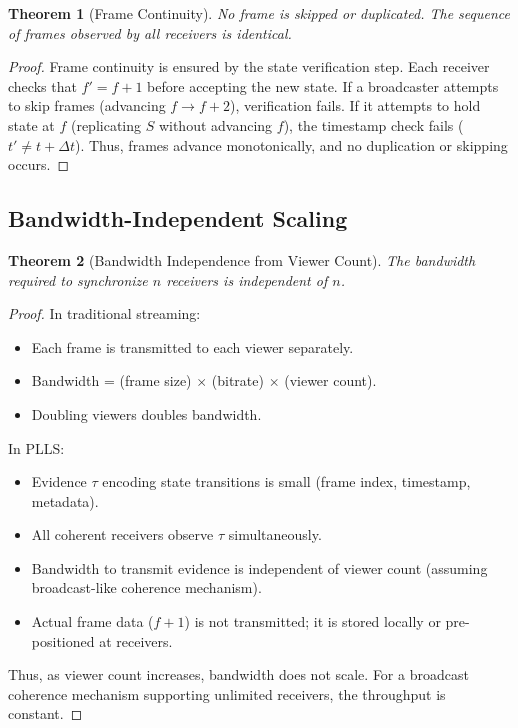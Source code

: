 \documentclass[twocolumn,10pt,a4paper]{article}
\theoremstyle{plain}
\newtheorem{theorem}{Theorem}[section]
\theoremstyle{definition}
\begin{document}
\begin{theorem}[Frame Continuity]
No frame is skipped or duplicated. The sequence of frames observed by all receivers is identical.
\end{theorem}

\begin{proof}
Frame continuity is ensured by the state verification step. Each receiver checks that $f' = f + 1$ before accepting the new state. If a broadcaster attempts to skip frames (advancing $f \to f+2$), verification fails. If it attempts to hold state at $f$ (replicating $S$ without advancing $f$), the timestamp check fails ($t' \neq t + \Delta t$). Thus, frames advance monotonically, and no duplication or skipping occurs.
\end{proof}

\subsection{Bandwidth-Independent Scaling}

\begin{theorem}[Bandwidth Independence from Viewer Count]
The bandwidth required to synchronize $n$ receivers is independent of $n$.
\end{theorem}

\begin{proof}
In traditional streaming:
\begin{itemize}
\item Each frame is transmitted to each viewer separately.
\item Bandwidth = (frame size) $\times$ (bitrate) $\times$ (viewer count).
\item Doubling viewers doubles bandwidth.
\end{itemize}

In PLLS:
\begin{itemize}
\item Evidence $\tau$ encoding state transitions is small (frame index, timestamp, metadata).
\item All coherent receivers observe $\tau$ simultaneously.
\item Bandwidth to transmit evidence is independent of viewer count (assuming broadcast-like coherence mechanism).
\item Actual frame data ($f+1$) is not transmitted; it is stored locally or pre-positioned at receivers.
\end{itemize}

Thus, as viewer count increases, bandwidth does not scale. For a broadcast coherence mechanism supporting unlimited receivers, the throughput is constant.
\end{proof}
\end{document}
